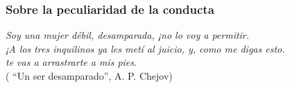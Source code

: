 \protect\hypertarget{M21}{}{}

\hypertarget{sobre-la-peculiaridad-de-la-conducta}{\subsubsection{Sobre la peculiaridad de la conducta}
\label{sobre-la-peculiaridad-de-la-conducta}}

\noindent \emph{
Soy una mujer débil, desamparada, ¡no lo voy a permitir.\\
¡A los tres inquilinos ya les metí al juicio, y, como me digas esto.\\
te vas a arrastrarte a mis pies.\\}
( ``Un ser desamparado'', A. P. Chejov)\\



